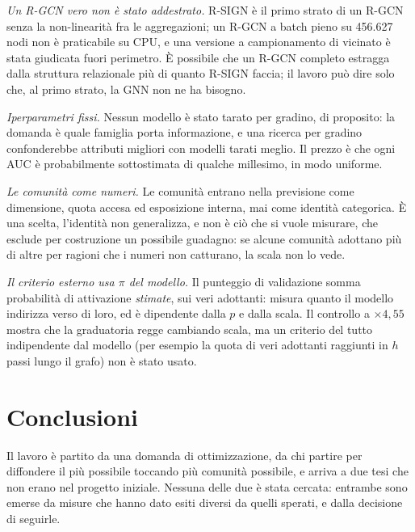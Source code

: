 \documentclass[11pt,a4paper]{article}
\begin{document}
\emph{Un R-GCN vero non è stato addestrato.} R-SIGN è il primo strato di un R-GCN senza la non-linearità fra le aggregazioni; un R-GCN a batch pieno su 456.627 nodi non è praticabile su CPU, e una versione a campionamento di vicinato è stata giudicata fuori perimetro. È possibile che un R-GCN completo estragga dalla struttura relazionale più di quanto R-SIGN faccia; il lavoro può dire solo che, al primo strato, la GNN non ne ha bisogno.

\emph{Iperparametri fissi.} Nessun modello è stato tarato per gradino, di proposito: la domanda è quale famiglia porta informazione, e una ricerca per gradino confonderebbe attributi migliori con modelli tarati meglio. Il prezzo è che ogni AUC è probabilmente sottostimata di qualche millesimo, in modo uniforme.

\emph{Le comunità come numeri.} Le comunità entrano nella previsione come dimensione, quota accesa ed esposizione interna, mai come identità categorica. È una scelta, l'identità non generalizza, e non è ciò che si vuole misurare, che esclude per costruzione un possibile guadagno: se alcune comunità adottano più di altre per ragioni che i numeri non catturano, la scala non lo vede.

\emph{Il criterio esterno usa $\pi$ del modello.} Il punteggio di validazione somma probabilità di attivazione \emph{stimate}, sui veri adottanti: misura quanto il modello indirizza verso di loro, ed è dipendente dalla $p$ e dalla scala. Il controllo a $\times 4{,}55$ mostra che la graduatoria regge cambiando scala, ma un criterio del tutto indipendente dal modello (per esempio la quota di veri adottanti raggiunti in $h$ passi lungo il grafo) non è stato usato.

\clearpage
\section{Conclusioni}
\label{sec:conclusioni}
Il lavoro è partito da una domanda di ottimizzazione, da chi partire per diffondere il più possibile toccando più comunità possibile, e arriva a due tesi che non erano nel progetto iniziale. Nessuna delle due è stata cercata: entrambe sono emerse da misure che hanno dato esiti diversi da quelli sperati, e dalla decisione di seguirle.
\end{document}
